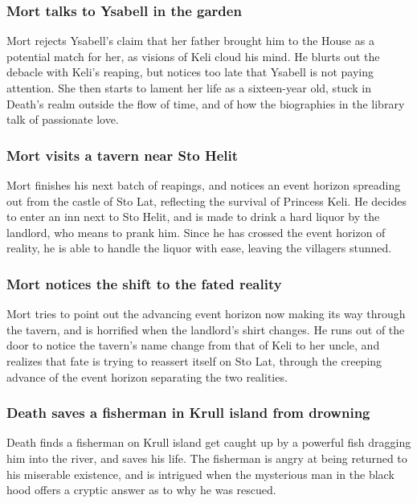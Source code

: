 \subsubsection{\Gls{Mort} talks to \Gls{Ysabell} in the garden}
\Gls{Mort} rejects \Gls{Ysabell}'s claim that her father brought him to the House as a potential
match for her, as visions of \Gls{Keli} cloud his mind. He blurts out the debacle with \Gls{Keli}'s
reaping, but notices too late that \Gls{Ysabell} is not paying attention. She then starts to lament
her life as a sixteen-year old, stuck in \Gls{Death}'s realm outside the flow of time, and of how
the biographies in the library talk of passionate love.

\subsubsection{\Gls{Mort} visits a tavern near Sto Helit}
\Gls{Mort} finishes his next batch of reapings, and notices an event horizon spreading out from the
castle of Sto Lat, reflecting the survival of Princess \Gls{Keli}. He decides to enter an inn next
to Sto Helit, and is made to drink a hard liquor by the landlord, who means to prank him. Since he
has crossed the event horizon of reality, he is able to handle the liquor with ease, leaving the
villagers stunned.

\subsubsection{\Gls{Mort} notices the shift to the fated reality}
\Gls{Mort} tries to point out the advancing event horizon now making its way through the tavern,
and is horrified when the landlord's shirt changes. He runs out of the door to notice the tavern's
name change from that of \Gls{Keli} to her uncle, and realizes that fate is trying to reassert
itself on Sto Lat, through the creeping advance of the event horizon separating the two realities.

\subsubsection{\Gls{Death} saves a fisherman in Krull island from drowning}
\Gls{Death} finds a fisherman on Krull island get caught up by a powerful fish dragging him into
the river, and saves his life. The fisherman is angry at being returned to his miserable existence,
and is intrigued when the mysterious man in the black hood offers a cryptic answer as to why he
was rescued.

